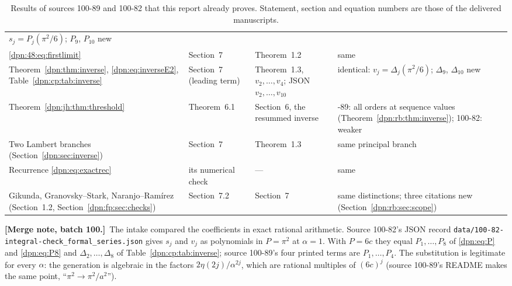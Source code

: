 \documentclass[11pt]{article}
\numberwithin{equation}{section}
\theoremstyle{definition}\newtheorem{definition}[theorem]{Definition}
\theoremstyle{remark}\newtheorem{remark}[theorem]{Remark}
\newcommand{\file}[1]{\nolinkurl{#1}}
\newcommand{\mergenoted}[1]{\par\smallskip\noindent\textbf{[Merge note, batch 100.]}\ #1\par\smallskip}
\begin{document}
\begin{table}[!htbp]
\begin{tabular}{>{\raggedright\arraybackslash}p{3.7cm}>{\raggedright\arraybackslash}p{2.9cm}>{\raggedright\arraybackslash}p{2.9cm}>{\raggedright\arraybackslash}p{4.0cm}}
 $s_j=P_j(\pi^2/6)$; $P_9$, $P_{10}$ new\\
\eqref{dpn:48:eq:firstlimit} & Section~7 & Theorem~1.2 & same\\
Theorem~\ref{dpn:thm:inverse}, \eqref{dpn:eq:inverseE2},
 Table~\ref{dpn:cp:tab:inverse} & Section~7 (leading term) & Theorem~1.3,
 $v_2,\dots,v_4$; JSON $v_2,\dots,v_{10}$ & identical: $v_j=\Delta_j(\pi^2/6)$;
 $\Delta_9$, $\Delta_{10}$ new\\
Theorem~\ref{dpn:jh:thm:threshold} & Theorem~6.1 & Section~6, the resummed
 inverse & 100-89: all orders at sequence values
 (Theorem~\ref{dpn:rb:thm:inverse}); 100-82: weaker\\
Two Lambert branches (Section~\ref{dpn:sec:inverse}) & Section~7 &
 Theorem~1.3 & same principal branch\\
Recurrence \eqref{dpn:eq:exactrec} & its numerical check & --- & same\\
Gikunda, Granovsky--Stark, Naranjo--Ram\'irez (Section~1.2,
 Section~\ref{dpn:fp:sec:checks}) & Section~7.2 & Section~7 & same
 distinctions; three citations new (Section~\ref{dpn:rb:sec:scope})\\
\bottomrule
\end{tabular}
\caption{Results of sources 100-89 and 100-82 that this report already proves.
Statement, section and equation numbers are those of the delivered
manuscripts.}\label{dpn:rb:tab:dup}
\end{table}

\mergenoted{The intake compared the coefficients in exact rational
arithmetic.  Source 100-82's JSON record
\file{data/100-82-integral-check_formal_series.json} gives $s_j$ and $v_j$ as
polynomials in $P=\pi^2$ at $\alpha=1$.  With $P=6c$ they equal
$P_1,\dots,P_8$ of \eqref{dpn:eq:P} and \eqref{dpn:eq:P8} and
$\Delta_2,\dots,\Delta_8$ of Table~\ref{dpn:cp:tab:inverse}; source 100-89's
four printed terms are $P_1,\dots,P_4$.  The substitution is legitimate for
every $\alpha$: the generation is algebraic in the factors
$2\eta(2j)/\alpha^{2j}$, which are rational multiples of $(6c)^j$ (source
100-89's README makes the same point, ``$\pi^2\to\pi^2/a^2$'').}
\end{document}
